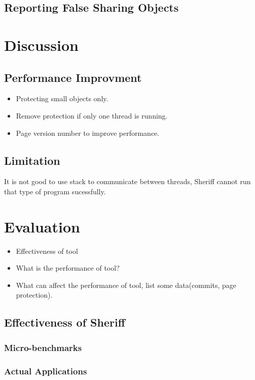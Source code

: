 \documentclass[10pt]{sigplanconf}
\begin{document}
\subsection{Reporting False Sharing Objects}

\section{Discussion}
\subsection{Performance Improvment}
\begin{itemize} 
\item Protecting small objects only.
\item Remove protection if only one thread is running.
\item Page version number to improve performance.
\end{itemize} 

\subsection{Limitation}
It is not good to use stack to communicate between threads, Sheriff cannot run that type of program sucessfully.

\section{Evaluation}
\begin{itemize}
\item Effectiveness of tool
\item What is the performance of tool? 
\item What can affect the performance of tool, list some data(commits, page protection).
  
\end{itemize}
\subsection{Effectiveness of Sheriff}
\subsubsection{Micro-benchmarks}
\subsubsection{Actual Applications}
\end{document}
